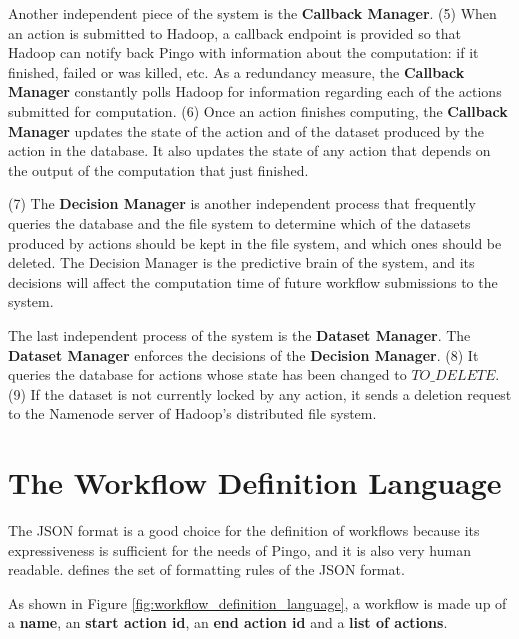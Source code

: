 Another independent piece of the system is the \textbf{Callback Manager}.  (5) When an action is submitted  to Hadoop, a callback endpoint is provided so that Hadoop can notify back Pingo with information about the computation: if it finished, failed or was killed, etc.  As a redundancy measure, the \textbf{Callback Manager} constantly polls Hadoop for information regarding each of the actions submitted for computation.  (6) Once an action finishes computing, the \textbf{Callback Manager} updates the state of the action and of the dataset produced by the action in the database. It also updates the state of any action that depends on the output of the computation that just finished.

(7) The \textbf{Decision Manager} is another independent process that frequently queries the database and the file system to determine which of the datasets produced by actions should be kept in the file system, and which ones should be deleted. The Decision Manager is the predictive brain of the system, and its decisions will affect the computation time of future workflow submissions to the system.

The last independent process of the system is the \textbf{Dataset Manager}.  The \textbf{Dataset Manager} enforces the decisions of the \textbf{Decision Manager}.  (8) It queries the database for actions whose state has been changed to $TO\_DELETE$. (9) If the dataset is not currently locked by any action, it sends a deletion request to the Namenode server of Hadoop's distributed file system.

\section{The Workflow Definition Language}
 The JSON format is a good choice for the definition of workflows because its expressiveness is sufficient for the needs of Pingo, and it is also very human readable. \cite{bray2014javascript} defines the set of formatting rules of the JSON format.
 
 As shown in Figure \ref{fig:workflow_definition_language}, a workflow is made up of a \textbf{name}, an \textbf{start action id}, an \textbf{end action id} and a \textbf{list of actions}. 

